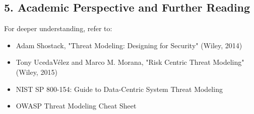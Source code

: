 \subsection*{5. Academic Perspective and Further Reading}
For deeper understanding, refer to:
\begin{itemize}
	\item Adam Shostack, "Threat Modeling: Designing for Security" (Wiley, 2014)
	\item Tony UcedaVélez and Marco M. Morana, "Risk Centric Threat Modeling" (Wiley, 2015)
	\item NIST SP 800-154: Guide to Data-Centric System Threat Modeling
	\item OWASP Threat Modeling Cheat Sheet
\end{itemize}
